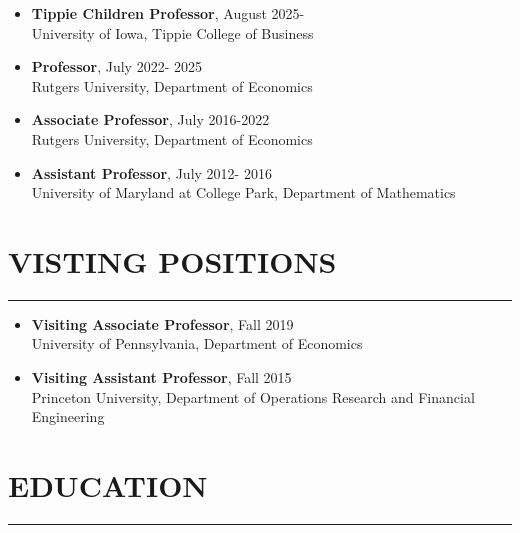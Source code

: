 \documentclass[11pt]{article}
\begin{document}
\begin{itemize}

\item \textbf{Tippie Children Professor}, August 2025- \\
University of Iowa, Tippie College of Business
\item \textbf{Professor}, July 2022- 2025\\
Rutgers University, Department of Economics
\item \textbf{Associate Professor}, July 2016-2022\\
Rutgers University, Department of Economics
\item \textbf{Assistant Professor}, July 2012- 2016\\
University of Maryland at College Park, Department of Mathematics

\end{itemize}


\section*{VISTING POSITIONS}
\hrule

\hfill

\begin{itemize}
\item \textbf{Visiting Associate Professor}, Fall 2019\\
 University of Pennsylvania, Department of Economics


\item\textbf{Visiting Assistant Professor}, Fall 2015\\
Princeton University, Department of Operations Research and
Financial Engineering%
\end{itemize}



\section*{EDUCATION}
\hrule
\end{document}
